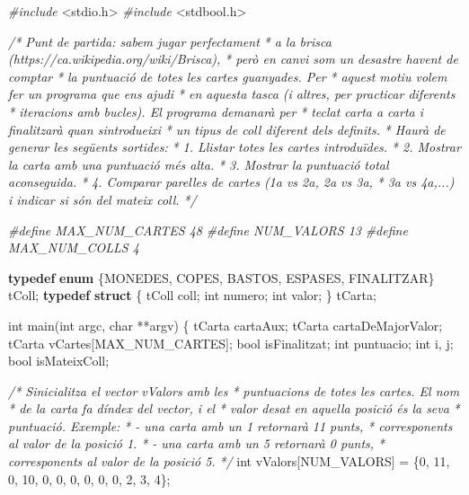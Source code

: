 \documentclass[]{book}
\newenvironment{Shaded}{\begin{snugshade}}{\end{snugshade}}
\newcommand{\CommentTok}[1]{\textcolor[rgb]{0.56,0.35,0.01}{\textit{#1}}}
\newcommand{\DataTypeTok}[1]{\textcolor[rgb]{0.13,0.29,0.53}{#1}}
\newcommand{\DecValTok}[1]{\textcolor[rgb]{0.00,0.00,0.81}{#1}}
\newcommand{\ImportTok}[1]{#1}
\newcommand{\KeywordTok}[1]{\textcolor[rgb]{0.13,0.29,0.53}{\textbf{#1}}}
\newcommand{\NormalTok}[1]{#1}
\newcommand{\PreprocessorTok}[1]{\textcolor[rgb]{0.56,0.35,0.01}{\textit{#1}}}
\begin{document}
\begin{Shaded}
\begin{Highlighting}[]
\PreprocessorTok{\#include }\ImportTok{\textless{}stdio.h\textgreater{}}
\PreprocessorTok{\#include }\ImportTok{\textless{}stdbool.h\textgreater{}}

\CommentTok{/* Punt de partida: sabem jugar perfectament}
\CommentTok{ * a la brisca (https://ca.wikipedia.org/wiki/Brisca), }
\CommentTok{ * però en canvi som un desastre havent de comptar}
\CommentTok{ * la puntuació de totes les cartes guanyades. Per}
\CommentTok{ * aquest motiu volem fer un programa que ens ajudi}
\CommentTok{ * en aquesta tasca (i altres, per practicar diferents}
\CommentTok{ * iteracions amb bucles). El programa demanarà per }
\CommentTok{ * teclat carta a carta i finalitzarà quan s\textquotesingle{}introdueixi}
\CommentTok{ * un tipus de coll diferent dels definits.}
\CommentTok{ * Haurà de generar les següents sortides:}
\CommentTok{ * 1. Llistar totes les cartes introduïdes.}
\CommentTok{ * 2. Mostrar la carta amb una puntuació més alta.}
\CommentTok{ * 3. Mostrar la puntuació total aconseguida.}
\CommentTok{ * 4. Comparar parelles de cartes (1a vs 2a, 2a vs 3a,}
\CommentTok{ *    3a vs 4a,...) i indicar si són del mateix coll.}
\CommentTok{ */}

\PreprocessorTok{\#define MAX\_NUM\_CARTES 48}
\PreprocessorTok{\#define NUM\_VALORS 13}
\PreprocessorTok{\#define MAX\_NUM\_COLLS 4}

\KeywordTok{typedef} \KeywordTok{enum}\NormalTok{ \{MONEDES, COPES, BASTOS, ESPASES, FINALITZAR\} tColl;}
\KeywordTok{typedef} \KeywordTok{struct}\NormalTok{ \{}
\NormalTok{    tColl coll;}
    \DataTypeTok{int}\NormalTok{ numero;}
    \DataTypeTok{int}\NormalTok{ valor;}
\NormalTok{\} tCarta;}

\DataTypeTok{int}\NormalTok{ main(}\DataTypeTok{int}\NormalTok{ argc, }\DataTypeTok{char}\NormalTok{ **argv) \{}
\NormalTok{    tCarta cartaAux;}
\NormalTok{    tCarta cartaDeMajorValor;}
\NormalTok{    tCarta vCartes[MAX\_NUM\_CARTES];}
    \DataTypeTok{bool}\NormalTok{ isFinalitzat;}
    \DataTypeTok{int}\NormalTok{ puntuacio;}
    \DataTypeTok{int}\NormalTok{ i, j;}
    \DataTypeTok{bool}\NormalTok{ isMateixColl;}
    
    \CommentTok{/* S\textquotesingle{}inicialitza el vector vValors amb les}
\CommentTok{     * puntuacions de totes les cartes. El nom}
\CommentTok{     * de la carta fa d\textquotesingle{}índex del vector, i el}
\CommentTok{     * valor desat en aquella posició és la seva}
\CommentTok{     * puntuació. Exemple: }
\CommentTok{     * {-} una carta amb un 1 retornarà 11 punts,}
\CommentTok{     *   corresponents al valor de la posició 1.}
\CommentTok{     * {-} una carta amb un 5 retornarà 0 punts,}
\CommentTok{     *   corresponents al valor de la posició 5.}
\CommentTok{     */}
    \DataTypeTok{int}\NormalTok{ vValors[NUM\_VALORS] = \{}\DecValTok{0}\NormalTok{, }\DecValTok{11}\NormalTok{, }\DecValTok{0}\NormalTok{, }\DecValTok{10}\NormalTok{, }\DecValTok{0}\NormalTok{, }\DecValTok{0}\NormalTok{, }\DecValTok{0}\NormalTok{, }\DecValTok{0}\NormalTok{, }\DecValTok{0}\NormalTok{, }\DecValTok{0}\NormalTok{, }\DecValTok{2}\NormalTok{, }\DecValTok{3}\NormalTok{, }\DecValTok{4}\NormalTok{\};}


\end{Highlighting}
\end{Shaded}
\end{document}
